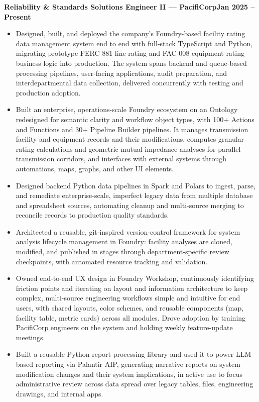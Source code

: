 \documentclass[10pt, letterpaper]{article}
\newcommand{\jobline}[2]{%
  \vspace{5pt}%
  \noindent\textbf{#1}\hfill\textbf{#2}\par%
  \vspace{1pt}%
}
\newenvironment{rlist}{%
  \begin{itemize}[leftmargin=1.4em, itemsep=1pt, topsep=2pt, parsep=0pt]%
}{%
  \end{itemize}%
}
\begin{document}
\jobline{Reliability \& Standards Solutions Engineer II --- PacifiCorp}{Jan 2025 -- Present}
\begin{rlist}
  \item Designed, built, and deployed the company's Foundry-based facility rating data management system end to end with full-stack TypeScript and Python, migrating prototype FERC-881 line-rating and FAC-008 equipment-rating business logic into production. The system spans backend and queue-based processing pipelines, user-facing applications, audit preparation, and interdepartmental data collection, delivered concurrently with testing and production adoption.
  \item Built an enterprise, operations-scale Foundry ecosystem on an Ontology redesigned for semantic clarity and workflow object types, with 100+ Actions and Functions and 30+ Pipeline Builder pipelines. It manages transmission facility and equipment records and their modifications, computes granular rating calculations and geometric mutual-impedance analyses for parallel transmission corridors, and interfaces with external systems through automations, maps, graphs, and other UI elements.
  \item Designed backend Python data pipelines in Spark and Polars to ingest, parse, and remediate enterprise-scale, imperfect legacy data from multiple database and spreadsheet sources, automating cleanup and multi-source merging to reconcile records to production quality standards.
  \item Architected a reusable, git-inspired version-control framework for system analysis lifecycle management in Foundry: facility analyses are cloned, modified, and published in stages through department-specific review checkpoints, with automated resource tracking and validation.
  \item Owned end-to-end UX design in Foundry Workshop, continuously identifying friction points and iterating on layout and information architecture to keep complex, multi-source engineering workflows simple and intuitive for end users, with shared layouts, color schemes, and reusable components (map, facility table, metric cards) across all modules. Drove adoption by training PacifiCorp engineers on the system and holding weekly feature-update meetings.
  \item Built a reusable Python report-processing library and used it to power LLM-based reporting via Palantir AIP, generating narrative reports on system modification changes and their system implications, in active use to focus administrative review across data spread over legacy tables, files, engineering drawings, and internal apps.

\end{rlist}
\end{document}
